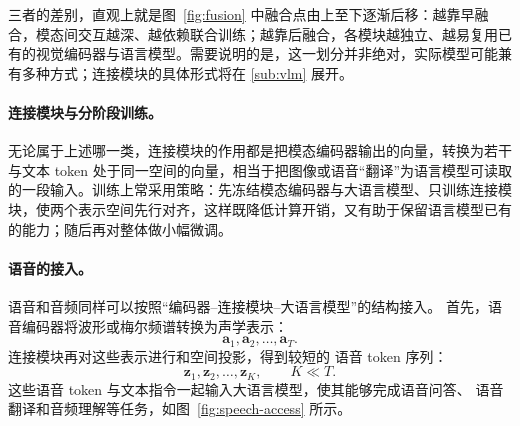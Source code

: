 三者的差别，直观上就是图~\ref{fig:fusion} 中融合点由上至下逐渐后移：越靠早融合，模态间交互越深、越依赖联合训练；越靠后融合，各模块越独立、越易复用已有的视觉编码器与语言模型。需要说明的是，这一划分并非绝对，实际模型可能兼有多种方式；连接模块的具体形式将在 \ref{sub:vlm} 展开。

\paragraph{连接模块与分阶段训练。}无论属于上述哪一类，连接模块的作用都是把模态编码器输出的向量，转换为若干与文本 token 处于同一空间的向量，相当于把图像或语音“翻译”为语言模型可读取的一段输入。训练上常采用策略：先冻结模态编码器与大语言模型、只训练连接模块，使两个表示空间先行对齐，这样既降低计算开销，又有助于保留语言模型已有的能力；随后再对整体做小幅微调。

\paragraph{语音的接入。}
语音和音频同样可以按照“编码器--连接模块--大语言模型”的结构接入。
首先，语音编码器将波形或梅尔频谱转换为声学表示：
\[
\mathbf{a}_1,\mathbf{a}_2,\ldots,\mathbf{a}_T .
\]
连接模块再对这些表示进行和空间投影，得到较短的
语音 token 序列：
\[
\mathbf{z}_1,\mathbf{z}_2,\ldots,\mathbf{z}_K,
\qquad K \ll T .
\]
这些语音 token 与文本指令一起输入大语言模型，使其能够完成语音问答、
语音翻译和音频理解等任务，如图~\ref{fig:speech-access} 所示。

